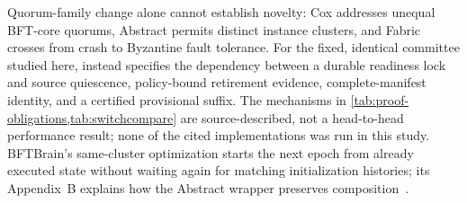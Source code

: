 Quorum-family change alone cannot establish novelty: Cox addresses unequal BFT-core quorums,
Abstract permits distinct instance clusters, and Fabric crosses from crash to Byzantine fault
tolerance. For the fixed, identical committee studied here, \sage{} instead specifies the
dependency between a durable readiness lock and source quiescence, policy-bound retirement
evidence, complete-manifest identity, and a certified provisional suffix. The mechanisms in
\cref{tab:proof-obligations,tab:switchcompare} are source-described, not a head-to-head performance
result; none of the cited implementations was run in this study. BFTBrain's same-cluster
optimization starts the next epoch from already executed state without waiting again for
matching initialization histories; its Appendix~B explains how the Abstract wrapper preserves
composition~\cite{bftbrain,abstracteurosys}.

